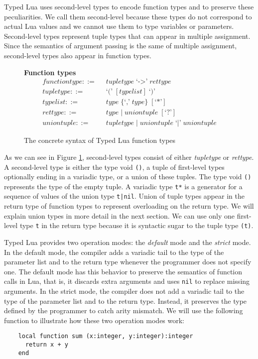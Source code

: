 Typed Lua uses second-level types to encode function types
and to preserve these peculiarities.
We call them second-level because these types do not correspond
to actual Lua values and we cannot use them to type variables or
parameters.
Second-level types represent tuple types that can appear in multiple assignment.
Since the semantics of argument passing is the same of multiple assignment,
second-level types also appear in function types.

\begin{figure}[!ht]
\textbf{Function types}\\
\dstart
\begin{align*}
\textit{functiontype} ::= & \;\; \textit{tupletype} \; \texttt{`->'} \; \textit{rettype}\\
\textit{tupletype} ::= & \;\; \texttt{`('} \; [typelist] \; \texttt{`)'}\\
\textit{typelist} ::= & \;\; \textit{type} \; \{\texttt{`,'} \; \textit{type}\} \; [\texttt{`*'}]\\
\textit{rettype} ::= & \;\; \textit{type} \; | \;
  \textit{uniontuple} \; [\texttt{`?'}]\\
\textit{uniontuple} ::= & \;\; \textit{tupletype} \; | \;
  \textit{uniontuple} \; \texttt{`|'} \; \textit{uniontuple}
\end{align*}
\dend
\caption{The concrete syntax of Typed Lua function types}
\label{fig:functions}
\end{figure}

As we can see in Figure \ref{fig:functions}, second-level types consist
of either \emph{tupletype} or \emph{rettype}.
A second-level type is either the type void \texttt{()},
a tuple of first-level types optionally ending in a variadic type,
or a union of these tuples.
The type void \texttt{()} represents the type of the empty tuple.
A variadic type \texttt{t*} is a generator for a sequence of values
of the union type \texttt{t|nil}.
Union of tuple types appear in the return type of function types to
represent overloading on the return type.
We will explain union types in more detail in the next section.
We can use only one first-level type \texttt{t} in the return type
because it is syntactic sugar to the tuple type \texttt{(t)}.

Typed Lua provides two operation modes: the \emph{default} mode and
the \emph{strict} mode.
In the default mode, the compiler adds a variadic tail to the
type of the parameter list and to the return type whenever the
programmer does not specify one.
The default mode has this behavior to preserve the semantics
of function calls in Lua, that is, it discards extra arguments and
uses \texttt{nil} to replace missing arguments.
In the strict mode, the compiler does not add a variadic tail
to the type of the parameter list and to the return type.
Instead, it preserves the type defined by the programmer to catch
arity mismatch.
We will use the following function to illustrate how these two
operation modes work:
\begin{verbatim}
    local function sum (x:integer, y:integer):integer
      return x + y
    end
\end{verbatim}

